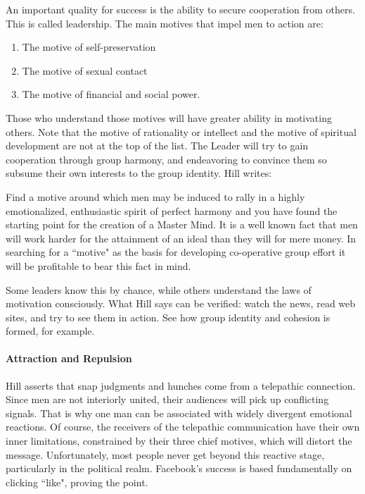An important quality for success is the ability to secure cooperation from others. This is called leadership. The main motives that impel men to action are:

\begin{enumerate}
\item The motive of self-preservation 
\item The motive of sexual contact 
\item The motive of financial and social power. 
\end{enumerate}
Those who understand those motives will have greater ability in motivating others. Note that the motive of rationality or intellect and the motive of spiritual development are not at the top of the list. The Leader will try to gain cooperation through group harmony, and endeavoring to convince them so subsume their own interests to the group identity. Hill writes:

\begin{quotex}
Find a motive around which men may be induced to rally in a highly emotionalized, enthusiastic spirit of perfect harmony and you have found the starting point for the creation of a Master Mind. It is a well known fact that men will work harder for the attainment of an ideal than they will for mere money. In searching for a ``motive" as the basis for developing co-operative group effort it will be profitable to bear this fact in mind. 

\end{quotex}
Some leaders know this by chance, while others understand the laws of motivation consciously. What Hill says can be verified: watch the news, read web sites, and try to see them in action. See how group identity and cohesion is formed, for example.

\paragraph{Attraction and Repulsion}
Hill asserts that snap judgments and hunches come from a telepathic connection. Since men are not interiorly united, their audiences will pick up conflicting signals. That is why one man can be associated with widely divergent emotional reactions. Of course, the receivers of the telepathic communication have their own inner limitations, constrained by their three chief motives, which will distort the message. Unfortunately, most people never get beyond this reactive stage, particularly in the political realm. Facebook's success is based fundamentally on clicking ``like", proving the point.

